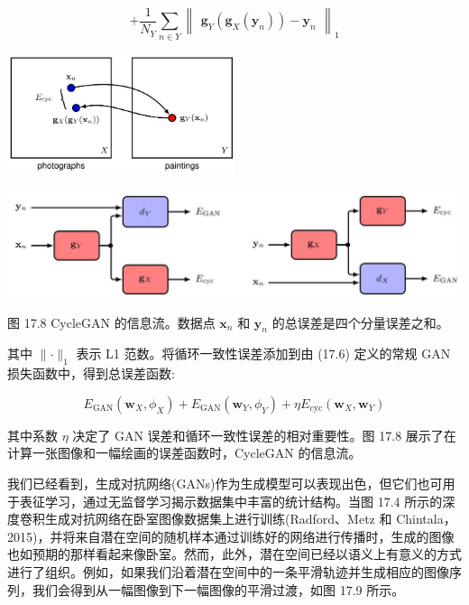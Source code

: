 \documentclass[10pt]{article}
\begin{document}
\[
+ \frac{1}{{N}_{Y}}\mathop{\sum }\limits_{{n \in  Y}}{\begin{Vmatrix}{\mathbf{g}}_{Y}\left( {\mathbf{g}}_{X}\left( {\mathbf{y}}_{n}\right) \right)  - {\mathbf{y}}_{n}\end{Vmatrix}}_{1} \tag{17.12}
\]

\begin{center}
\includegraphics[max width=0.5\textwidth]{images/0194e279-9b28-703a-88f4-c3ac21e2010d_560_831_1572_720_383_0.jpg}
\end{center}
\hspace*{3em} 

\begin{center}
\includegraphics[max width=1.0\textwidth]{images/0194e279-9b28-703a-88f4-c3ac21e2010d_561_227_342_1279_299_0.jpg}
\end{center}
\hspace*{3em} 

图 17.8 CycleGAN 的信息流。数据点 \({\mathbf{x}}_{n}\) 和 \({\mathbf{y}}_{n}\) 的总误差是四个分量误差之和。

其中 \(\parallel  \cdot  {\parallel }_{1}\) 表示 L1 范数。将循环一致性误差添加到由 (17.6) 定义的常规 GAN 损失函数中，得到总误差函数:

\[
{E}_{\mathrm{{GAN}}}\left( {{\mathbf{w}}_{X},{\phi }_{X}}\right)  + {E}_{\mathrm{{GAN}}}\left( {{\mathbf{w}}_{Y},{\phi }_{Y}}\right)  + \eta {E}_{\mathrm{{cyc}}}\left( {{\mathbf{w}}_{X},{\mathbf{w}}_{Y}}\right)  \tag{17.13}
\]

其中系数 \(\eta\) 决定了 GAN 误差和循环一致性误差的相对重要性。图 17.8 展示了在计算一张图像和一幅绘画的误差函数时，CycleGAN 的信息流。

我们已经看到，生成对抗网络(GANs)作为生成模型可以表现出色，但它们也可用于表征学习，通过无监督学习揭示数据集中丰富的统计结构。当图 17.4 所示的深度卷积生成对抗网络在卧室图像数据集上进行训练(Radford、Metz 和 Chintala，2015)，并将来自潜在空间的随机样本通过训练好的网络进行传播时，生成的图像也如预期的那样看起来像卧室。然而，此外，潜在空间已经以语义上有意义的方式进行了组织。例如，如果我们沿着潜在空间中的一条平滑轨迹并生成相应的图像序列，我们会得到从一幅图像到下一幅图像的平滑过渡，如图 17.9 所示。
\end{document}
